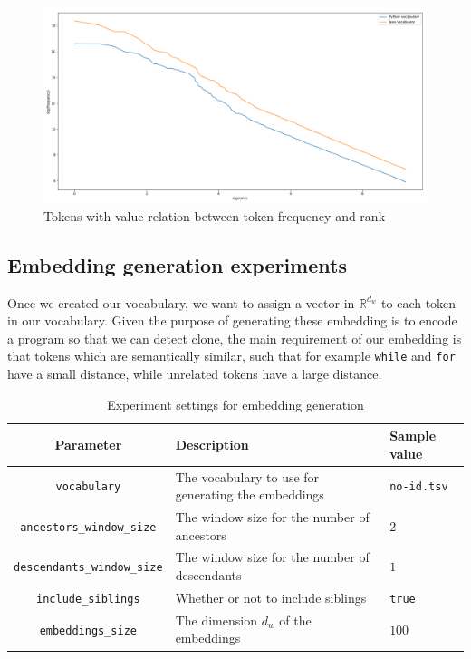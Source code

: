 \begin{figure}
  \centering\includegraphics[width=14cm]{images/distribution-with-values.png}
  \caption{\label{fig:with-values-vocabulary-distribution}Tokens with value
    relation between token frequency and rank}
\end{figure}

\subsection{Embedding generation experiments}
Once we created our vocabulary, we want to assign a vector in $\mathbb{R}^{d_w}$
to each token in our vocabulary. Given the purpose of generating these embedding
is to encode a program so that we can detect clone, the main requirement of our
embedding is that tokens which are semantically similar, such that for example
\lstinline{while} and \lstinline{for} have a small distance, while unrelated
tokens have a large distance.

\begin{table}
  \caption{\label{tab:embedding-hyper-parameters} Experiment settings for
    embedding generation}
  \begin{center}
    \begin{tabularx}{\linewidth}{c X l}
      \toprule
      Parameter & Description & Sample value\\
      \toprule
      \lstinline{vocabulary} & The vocabulary to use for generating the
      embeddings & \lstinline{no-id.tsv}\\
      \lstinline{ancestors_window_size} & The window size for the number of
      ancestors & $2$\\
      \lstinline{descendants_window_size} & The window size for the number of
      descendants & $1$\\
      \lstinline{include_siblings} & Whether or not to include siblings &
      \lstinline{true}\\
      \lstinline{embeddings_size} & The dimension $d_w$ of the embeddings & $100$\\
      \bottomrule
    \end{tabularx}
  \end{center}
\end{table}


